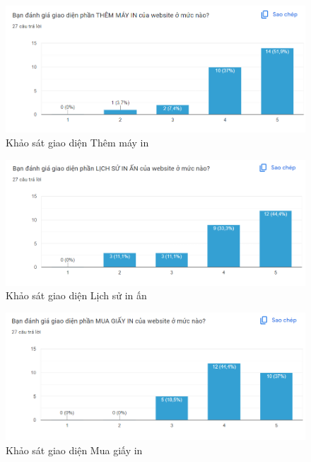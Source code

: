 \begin{figure}[H]
    \begin{center}
        \includegraphics[width=1\textwidth]{Images/Test/test6.png}
        \caption{Khảo sát giao diện Thêm máy in}
    \end{center}
\end{figure}
\begin{figure}[H]
    \begin{center}
        \includegraphics[width=1\textwidth]{Images/Test/test7.png}
        \caption{Khảo sát giao diện Lịch sử in ấn}
    \end{center}
\end{figure}
\begin{figure}[H]
    \begin{center}
        \includegraphics[width=1\textwidth]{Images/Test/test8.png}
        \caption{Khảo sát giao diện Mua giấy in}
    \end{center}
\end{figure}
